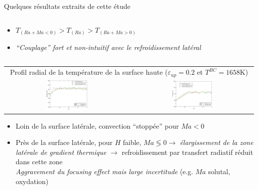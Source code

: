 \begin{frame}[fragile]
{\footnotesize Quelques résultats extraits de cette étude \cite{Peybernes2019}}
\begin{columns}[T]
    \begin{column}{0.4\textwidth}
    \begin{itemize}
\item $T_{(Ra+Ma<0)}>T_{(Ra)}>T_{(Ra+Ma>0)}$
\item \emph{``Couplage'' fort et non-intuitif avec le refroidissement latéral}
\end{itemize}
    \end{column}
    \end{columns}
\begin{tabular}{cc}
\multicolumn{2}{c}{\scriptsize Profil radial de la température de la surface haute ($\varepsilon_{up}=0.2$ et $T^{BC}=1658$K)} \\
\includegraphics[width=0.35\textwidth]{Figures/Fig5_Peybernes2019.png} & \includegraphics[width=0.35\textwidth]{Figures/Fig6_Peybernes2019.png}
\end{tabular}
\begin{itemize}
\item Loin de la surface latérale, convection ``stoppée'' pour $Ma<0$
\item Près de la surface latérale, pour $H$ faible, $Ma\lessgtr 0 \rightarrow$ \emph{élargissement de la zone latérale de gradient thermique} $\rightarrow$ refroidissement par transfert radiatif réduit dans cette zone \\
\emph{Aggravement du focusing effect mais large incertitude} (e.g. $Ma$ solutal, oxydation)
\end{itemize}
\end{frame}

